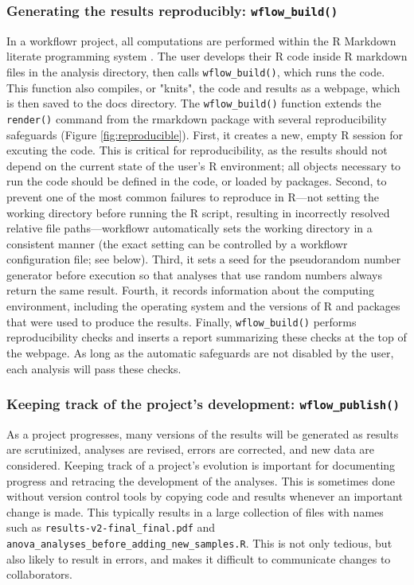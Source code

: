 \documentclass[9pt,a4paper]{extarticle}
\begin{document}
\subsubsection*{Generating the results reproducibly: \verb|wflow_build()|}

In a workflowr project, all computations are performed within the R
Markdown literate programming system \cite{Xie2018}. The user develops
their R code inside R markdown files in the analysis directory, then
calls \verb|wflow_build()|, which runs the code. This function also compiles,
or "knits", the code and results as a webpage, which is then saved to
the docs directory. The \verb|wflow_build()| function extends the \verb|render()|
command from the rmarkdown package with several reproducibility
safeguards (Figure \ref{fig:reproducible}). First, it creates a new, empty R session for
excuting the code. This is critical for reproducibility, as the results
should not depend on the current state of the user's R environment; all
objects necessary to run the code should be defined in the code, or
loaded by packages. Second, to prevent one of the most common failures
to reproduce in R—not setting the working directory before running the R
script, resulting in incorrectly resolved relative file paths—workflowr
automatically sets the working directory in a consistent manner (the
exact setting can be controlled by a workflowr configuration file; see
below). Third, it sets a seed for the pseudorandom number generator
before execution so that analyses that use random numbers always return
the same result. Fourth, it records information about the computing
environment, including the operating system and the versions of R and
packages that were used to produce the results. Finally, \verb|wflow_build()|
performs reproducibility checks and inserts a report summarizing these
checks at the top of the webpage. As long as the automatic safeguards
are not disabled by the user, each analysis will pass these checks.

\subsubsection*{Keeping track of the project's development: \verb|wflow_publish()|}

As a project progresses, many versions of the results will be generated
as results are scrutinized, analyses are revised, errors are corrected,
and new data are considered. Keeping track of a project's evolution is
important for documenting progress and retracing the development of the
analyses. This is sometimes done without version control tools by
copying code and results whenever an important change is made. This
typically results in a large collection of files with names such as
\verb|results-v2-final_final.pdf| and
\verb|anova_analyses_before_adding_new_samples.R|. This is not only
tedious, but also likely to result in errors, and makes it difficult to
communicate changes to collaborators.
\end{document}
